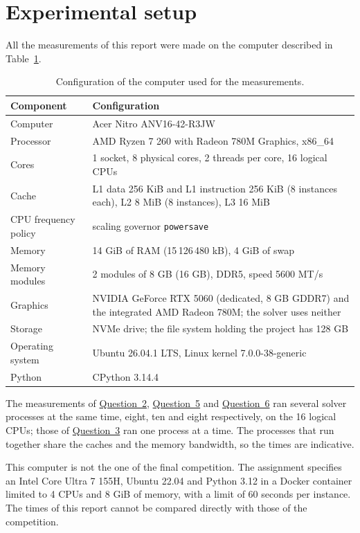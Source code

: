 \clearpage
\section{Experimental setup}\label{sec:setup}

All the measurements of this report were made on the computer described in Table~\ref{tab:setup}.
\begin{table}[H]
\centering
\begin{tabular}{@{}p{4.6cm}p{11.4cm}@{}}
\toprule
Component & Configuration\\
\midrule
Computer & Acer Nitro ANV16-42-R3JW\\
Processor & AMD Ryzen 7 260 with Radeon 780M Graphics, x86\_64\\
Cores & 1 socket, 8 physical cores, 2 threads per core, 16 logical CPUs\\
Cache & L1 data 256 KiB and L1 instruction 256 KiB (8 instances each), L2 8 MiB (8 instances), L3 16 MiB\\
CPU frequency policy & scaling governor \texttt{powersave}\\
Memory & 14 GiB of RAM (15\,126\,480 kB), 4 GiB of swap\\
Memory modules & 2 modules of 8 GB (16 GB), DDR5, speed 5600 MT/s\\
Graphics & NVIDIA GeForce RTX 5060 (dedicated, 8 GB GDDR7) and the integrated AMD Radeon 780M; the solver uses neither\\
Storage & NVMe drive; the file system holding the project has 128 GB\\
Operating system & Ubuntu 26.04.1 LTS, Linux kernel 7.0.0-38-generic\\
Python & CPython 3.14.4\\
\bottomrule
\end{tabular}
\caption{Configuration of the computer used for the measurements.}
\label{tab:setup}
\end{table}

The measurements of \hyperref[sec:q2]{Question~2}, \hyperref[sec:q5]{Question~5} and \hyperref[sec:q6]{Question~6} ran several solver processes at the same time, eight, ten and eight respectively, on the 16 logical CPUs; those of \hyperref[sec:q3]{Question~3} ran one process at a time. The processes that run together share the caches and the memory bandwidth, so the times are indicative.

This computer is not the one of the final competition. The assignment specifies an Intel Core Ultra 7 155H, Ubuntu 22.04 and Python 3.12 in a Docker container limited to 4 CPUs and 8 GiB of memory, with a limit of 60 seconds per instance. The times of this report cannot be compared directly with those of the competition.
